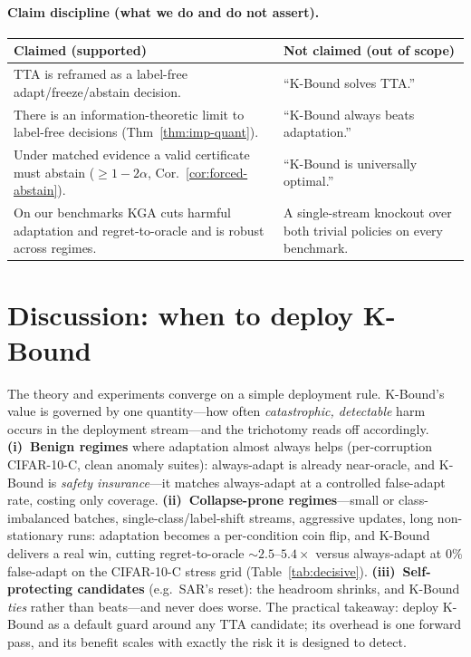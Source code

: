 \documentclass[11pt]{article}
\theoremstyle{plain}
\theoremstyle{definition}
\begin{document}
\paragraph{Claim discipline (what we do and do not assert).}
\begin{center}\small
\begin{tabular}{p{}p{}}
\toprule
\textbf{Claimed (supported)} & \textbf{Not claimed (out of scope)} \\
\midrule
TTA is reframed as a label-free adapt/freeze/abstain decision. & ``K-Bound solves TTA.'' \\
There is an information-theoretic limit to label-free decisions (Thm~\ref{thm:imp-quant}). & ``K-Bound always beats adaptation.'' \\
Under matched evidence a valid certificate must abstain ($\ge1-2\alpha$, Cor.~\ref{cor:forced-abstain}). & ``K-Bound is universally optimal.'' \\
On our benchmarks KGA cuts harmful adaptation and regret-to-oracle and is robust across regimes. & A single-stream knockout over both trivial policies on every benchmark. \\
\bottomrule
\end{tabular}
\end{center}

\section{Discussion: when to deploy K-Bound}\label{sec:discussion}
The theory and experiments converge on a simple deployment rule. K-Bound's value is governed
by one quantity---how often \emph{catastrophic, detectable} harm occurs in the deployment
stream---and the trichotomy reads off accordingly. \textbf{(i)~Benign regimes} where adaptation
almost always helps (per-corruption CIFAR-10-C, clean anomaly suites): always-adapt is already
near-oracle, and K-Bound is \emph{safety insurance}---it matches always-adapt at a controlled
false-adapt rate, costing only coverage. \textbf{(ii)~Collapse-prone regimes}---small or
class-imbalanced batches, single-class/label-shift streams, aggressive updates, long
non-stationary runs: adaptation becomes a per-condition coin flip, and K-Bound delivers a real
win, cutting regret-to-oracle $\sim$$2.5$--$5.4\times$ versus always-adapt at $0\%$ false-adapt
on the CIFAR-10-C stress grid (Table~\ref{tab:decisive}). \textbf{(iii)~Self-protecting
candidates} (e.g.\ SAR's reset): the headroom shrinks, and K-Bound \emph{ties} rather than
beats---and never does worse. The practical takeaway: deploy K-Bound as a default guard around
any TTA candidate; its overhead is one forward pass, and its benefit scales with exactly the
risk it is designed to detect.
\end{document}
